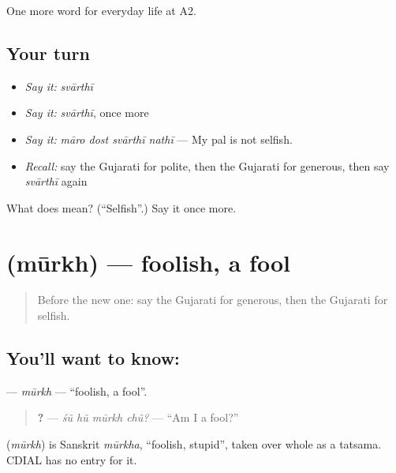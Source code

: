 \begin{grammarlens}[title={What you've built}]
One more word for everyday life at A2.
\end{grammarlens}

\subsection*{Your turn}
\begin{itemize}
\raggedright
  \item \emph{Say it:} \emph{svārthī}
  \item \emph{Say it:} \emph{svārthī}, once more
  \item \emph{Say it:} \emph{māro dost svārthī nathī} — My pal is not selfish.
  \item \emph{Recall:} say the Gujarati for polite, then the Gujarati for generous, then say \emph{svārthī} again
\end{itemize}

\begin{tcolorbox}[breakable,colback=teal!4,colframe=teal!35!black,title={Before you move on}]
What does  mean? (\textquotedblleft{}Selfish\textquotedblright{}.) Say it once more.
\end{tcolorbox}
\section[\texorpdfstring{\gu{મૂર્ખ} (mūrkh)}{મૂર્ખ (mūrkh)}]{ (mūrkh) — foolish, a fool}

\label{lesson:GU-C271-murkh}



\begin{quote}
Before the new one: say the Gujarati for generous, then the Gujarati for selfish.
\end{quote}

\subsection*{You'll want to know: }
\textbf{} — \emph{mūrkh} — \textquotedblleft{}foolish, a fool\textquotedblright{}.

\begin{quote}
\textbf{   ?} — \emph{śũ hũ mūrkh chũ?} — \textquotedblleft{}Am I a fool?\textquotedblright{}
\end{quote}

\begin{cousinweb}
\textbf{} (\emph{mūrkh}) is Sanskrit \emph{mūrkha}, \textquotedblleft{}foolish, stupid\textquotedblright{}, taken over whole as a tatsama. CDIAL has no entry for it.
\end{cousinweb}

